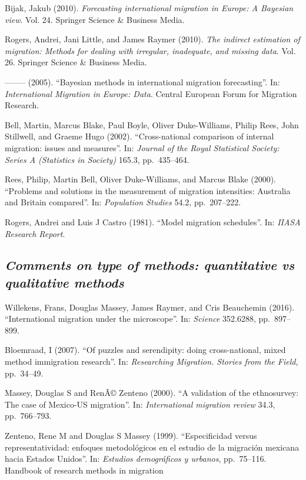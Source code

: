 \documentclass[
  12pt,
]{article}
\begin{document}
Bijak, Jakub (2010).
\emph{Forecasting international migration in Europe: A Bayesian view}.
Vol. 24. Springer Science \& Business Media.

Rogers, Andrei, Jani Little, and James Raymer (2010).
\emph{The indirect estimation of migration: Methods for dealing with irregular, inadequate, and missing data}.
Vol. 26. Springer Science \& Business Media.

-------- (2005). ``Bayesian methods in international migration
forecasting''. In: \emph{International Migration in Europe: Data}.
Central European Forum for Migration Research.

Bell, Martin, Marcus Blake, Paul Boyle, Oliver Duke-Williams, Philip
Rees, John Stillwell, and Graeme Hugo (2002). ``Cross-national
comparison of internal migration: issues and measures''. In:
\emph{Journal of the Royal Statistical Society: Series A (Statistics in Society)}
165.3, pp.~435--464.

Rees, Philip, Martin Bell, Oliver Duke-Williams, and Marcus Blake
(2000). ``Problems and solutions in the measurement of migration
intensities: Australia and Britain compared''. In:
\emph{Population Studies} 54.2, pp.~207--222.

Rogers, Andrei and Luis J Castro (1981). ``Model migration schedules''.
In: \emph{IIASA Research Report}.

\hypertarget{comments-on-type-of-methods-quantitative-vs-qualitative-methods}{%
\subsection{\texorpdfstring{\emph{Comments on type of methods:
quantitative vs qualitative
methods}}{Comments on type of methods: quantitative vs qualitative methods}}\label{comments-on-type-of-methods-quantitative-vs-qualitative-methods}}

Willekens, Frans, Douglas Massey, James Raymer, and Cris Beauchemin
(2016). ``International migration under the microscope''. In:
\emph{Science} 352.6288, pp.~897--899.

Bloemraad, I (2007). ``Of puzzles and serendipity: doing cross-national,
mixed method immigration research''. In:
\emph{Researching Migration. Stories from the Field}, pp.~34--49.

Massey, Douglas S and RenÃ© Zenteno (2000). ``A validation of the
ethnosurvey: The case of Mexico-US migration''. In:
\emph{International migration review} 34.3, pp.~766--793.

Zenteno, Rene M and Douglas S Massey (1999). ``Especificidad versus
representatividad: enfoques metodológicos en el estudio de la migración
mexicana hacia Estados Unidos''. In:
\emph{Estudios demográficos y urbanos}, pp.~75--116. Handbook of
research methods in migration
\end{document}
